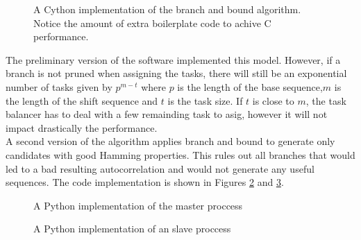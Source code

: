   \begin{figure}[ht!]
    \caption{A Cython implementation of the branch and bound algorithm. Notice
    the amount of extra boilerplate code to achive C performance.}
    \label{bb:fig:2}
  \end{figure}


  The preliminary version of the software implemented this model.  However, if a
  branch is not pruned when assigning the tasks, there will still be an
  exponential number of tasks
  given by $p^{m-t}$ where $p$ is the length of the base sequence,$m$ is the
  length of the shift sequence  and $t$ is the task size.  If $t$ is close to $m$,
  the task balancer has to deal with a few remainding  task to asig, however it
  will not impact drastically the performance.\\

  A second version of the algorithm applies branch and bound to generate only
  candidates with good Hamming properties.
  This rules out all branches that would led to a bad resulting autocorrelation
  and would not generate any useful sequences. The code
  implementation is shown in Figures \ref{parallelism_example:fig:1} and
  \ref{parallelism_example:fig:2}.\\

  \begin{figure}[ht!]
    \caption{A Python implementation of the master proccess}
    \label{parallelism_example:fig:1}
  \end{figure}

  \begin{figure}[ht!]
    \caption{A Python implementation of an slave proccess}
    \label{parallelism_example:fig:2}
  \end{figure}
